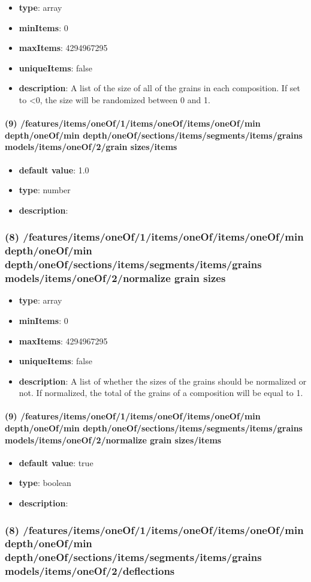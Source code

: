 \begin{itemize}[leftmargin=8em]\item {\bf type}: array
\item {\bf minItems}: 0
\item {\bf maxItems}: 4294967295
\item {\bf uniqueItems}: false
\item {\bf description}: A list of the size of all of the grains in each composition. If set to <0, the size will be randomized between 0 and 1.
\end{itemize}\paragraph{(9) /features/items/oneOf/1/items/oneOf/items/oneOf/min depth/oneOf/min depth/oneOf/sections/items/segments/items/grains models/items/oneOf/2/grain sizes/items}
\begin{itemize}[leftmargin=9em]\item {\bf default value}: 1.0
\item {\bf type}: number
\item {\bf description}: 
\end{itemize}\subsubsection{(8) /features/items/oneOf/1/items/oneOf/items/oneOf/min depth/oneOf/min depth/oneOf/sections/items/segments/items/grains models/items/oneOf/2/normalize grain sizes}
\begin{itemize}[leftmargin=8em]\item {\bf type}: array
\item {\bf minItems}: 0
\item {\bf maxItems}: 4294967295
\item {\bf uniqueItems}: false
\item {\bf description}: A list of whether the sizes of the grains should be normalized or not. If normalized, the total of the grains of a composition will be equal to 1.
\end{itemize}\paragraph{(9) /features/items/oneOf/1/items/oneOf/items/oneOf/min depth/oneOf/min depth/oneOf/sections/items/segments/items/grains models/items/oneOf/2/normalize grain sizes/items}
\begin{itemize}[leftmargin=9em]\item {\bf default value}: true
\item {\bf type}: boolean
\item {\bf description}: 
\end{itemize}\subsubsection{(8) /features/items/oneOf/1/items/oneOf/items/oneOf/min depth/oneOf/min depth/oneOf/sections/items/segments/items/grains models/items/oneOf/2/deflections}
